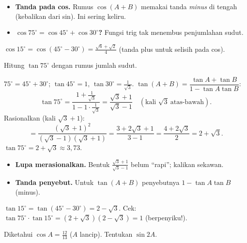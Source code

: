 \begin{jebakan}
\begin{itemize}[leftmargin=*,topsep=2pt]
  \item \textbf{Tanda pada cos.} Rumus $\cos(A+B)$ memakai tanda \emph{minus}
  di tengah (kebalikan dari sin). Ini sering keliru.
  \item \textbf{$\cos75^\circ=\cos45^\circ+\cos30^\circ$?} Fungsi trig tak
  menembus penjumlahan sudut.
\end{itemize}
\end{jebakan}

\begin{variasi}
$\cos15^\circ=\cos(45^\circ-30^\circ)=\frac{\sqrt6+\sqrt2}{4}$ (tanda plus
untuk selisih pada cos).
\end{variasi}

\begin{soalbox}{}
Hitung $\tan75^\circ$ dengan rumus jumlah sudut.
\end{soalbox}

\jawab
{} $75^\circ=45^\circ+30^\circ$; $\tan45^\circ=1$,
$\tan30^\circ=\frac{1}{\sqrt3}$.
 $\tan(A+B)=\dfrac{\tan A+\tan B}{1-\tan A\tan B}$:
\[
\tan75^\circ=\frac{1+\frac{1}{\sqrt3}}{1-1\cdot\frac{1}{\sqrt3}}
=\frac{\sqrt3+1}{\sqrt3-1}\quad(\text{kali }\sqrt3\ \text{atas-bawah}).
\]
 Rasionalkan (kali $\sqrt3+1$):
\[
=\frac{(\sqrt3+1)^2}{(\sqrt3-1)(\sqrt3+1)}=\frac{3+2\sqrt3+1}{3-1}
=\frac{4+2\sqrt3}{2}=2+\sqrt3.
\]
\jadi $\tan75^\circ=2+\sqrt3\approx3{,}73$.

\begin{jebakan}
\begin{itemize}[leftmargin=*,topsep=2pt]
  \item \textbf{Lupa merasionalkan.} Bentuk $\frac{\sqrt3+1}{\sqrt3-1}$ belum
  ``rapi''; kalikan sekawan.
  \item \textbf{Tanda penyebut.} Untuk $\tan(A+B)$ penyebutnya $1-\tan A\tan B$
  (minus).
\end{itemize}
\end{jebakan}

\begin{variasi}
$\tan15^\circ=\tan(45^\circ-30^\circ)=2-\sqrt3$. Cek: $\tan75^\circ\cdot
\tan15^\circ=(2+\sqrt3)(2-\sqrt3)=1$ (berpenyiku!).
\end{variasi}

\begin{soalbox}{}
Diketahui $\cos A=\tfrac{12}{13}$ ($A$ lancip). Tentukan $\sin2A$.
\end{soalbox}

